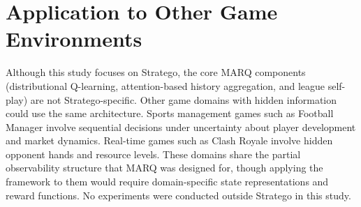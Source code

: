 \section{Application to Other Game Environments}
Although this study focuses on Stratego, the core MARQ components (distributional Q-learning, attention-based history aggregation, and league self-play) are not Stratego-specific. Other game domains with hidden information could use the same architecture. Sports management games such as Football Manager involve sequential decisions under uncertainty about player development and market dynamics. Real-time games such as Clash Royale involve hidden opponent hands and resource levels. These domains share the partial observability structure that MARQ was designed for, though applying the framework to them would require domain-specific state representations and reward functions. No experiments were conducted outside Stratego in this study.


